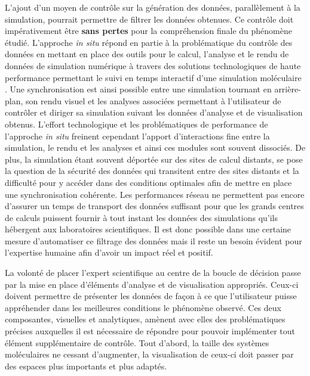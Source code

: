 L'ajout d'un moyen de contrôle sur la génération des données, parallèlement à la simulation, pourrait permettre de filtrer les données obtenues. Ce contrôle doit impérativement être \textbf{sans pertes} pour la compréhension finale du phénomène étudié. L'approche \textit{in situ} répond en partie à la problématique du contrôle des données en mettant en place des outils pour le calcul, l'analyse et le rendu de données de simulation numérique à travers des solutions technologiques de haute performance permettant le suivi en temps interactif d'une simulation moléculaire \cite{dreher_interactive_2013,kuhlen2011parallel,ma2009situ}. Une synchronisation est ainsi possible entre une simulation tournant en arrière-plan, son rendu visuel et les analyses associées permettant à l'utilisateur de contrôler et diriger sa simulation suivant les données d'analyse et de visualisation obtenus. L'effort technologique et les problématiques de performance de l'approche \textit{in situ} freinent cependant l'apport d'interactions fine entre la simulation, le rendu et les analyses et ainsi ces modules sont souvent dissociés. De plus, la simulation étant souvent déportée sur des sites de calcul distants, se pose la question de la sécurité des données qui transitent entre des sites distants et la difficulté pour y accéder dans des conditions optimales afin de mettre en place une synchronisation cohérente. Les performances réseau ne permettent pas encore d'assurer un temps de transport des données suffisant pour que les grands centres de calculs puissent fournir à tout instant les données des simulations qu'ils hébergent aux laboratoires scientifiques.
Il est donc possible dans une certaine mesure d'automatiser ce filtrage des données mais il reste un besoin évident pour l'expertise humaine afin d'avoir un impact réel et positif. 

La volonté de placer l'expert scientifique au centre de la boucle de décision passe par la mise en place d'éléments d'analyse et de visualisation appropriés. Ceux-ci doivent permettre de présenter les données de façon à ce que l'utilisateur puisse appréhender dans les meilleures conditions le phénomène observé. Ces deux composantes, visuelles et analytiques, amènent avec elles des problématiques précises auxquelles il est nécessaire de répondre pour pouvoir implémenter tout élément supplémentaire de contrôle. Tout d'abord, la taille des systèmes moléculaires ne cessant d'augmenter, la visualisation de ceux-ci doit passer par des espaces plus importants et plus adaptés.

